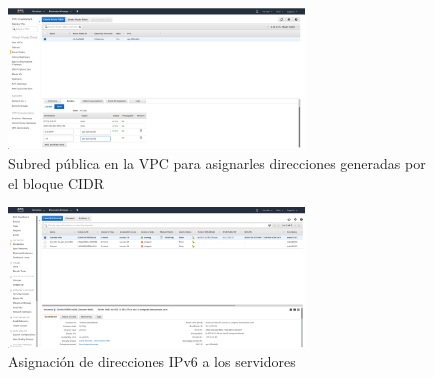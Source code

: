 \documentclass[9pt]{article}
\begin{document}
\begin{figure}[H]
  \centering
  \includegraphics[width=0.7\textwidth]{public_subnet}
  \caption{Subred pública en la VPC para asignarles direcciones generadas por el bloque CIDR}
\end{figure}

\begin{figure}[H]
  \centering
  \includegraphics[width=0.7\textwidth]{ipv6_assignment}
  \caption{Asignación de direcciones IPv6 a los servidores}
\end{figure}

\end{document}
